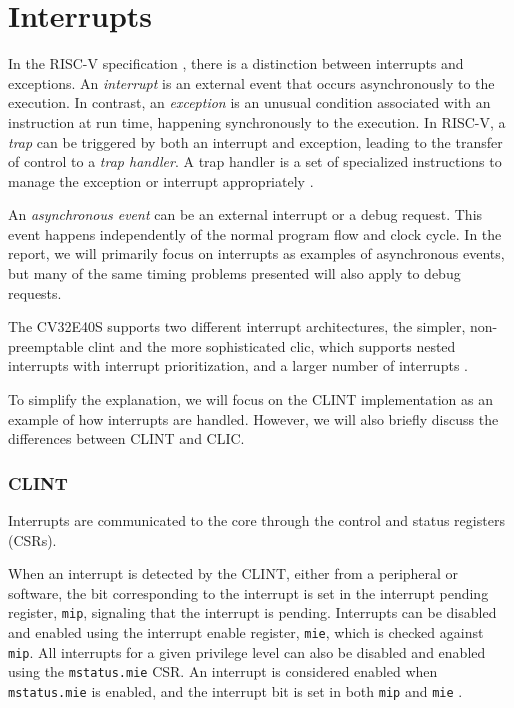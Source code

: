 \section{Interrupts}
\label{sec:bg_interrupts}

In the RISC-V specification \cite{watermanRISCVInstructionSet2021}, there is a distinction between interrupts and exceptions. An \textit{interrupt} is an external event that occurs asynchronously to the execution. In contrast, an \textit{exception} is an unusual condition associated with an instruction at run time, happening synchronously to the execution. In RISC-V, a \textit{trap} can be triggered by both an interrupt and exception, leading to the transfer of control to a \textit{trap handler}. A trap handler is a set of specialized instructions to manage the exception or interrupt appropriately \cite{watermanRISCVInstructionSet2021}. 

An \textit{asynchronous event} can be an external interrupt or a debug request. This event happens independently of the normal program flow and clock cycle. In the report, we will primarily focus on interrupts as examples of asynchronous events, but many of the same timing problems presented will also apply to debug requests.


The CV32E40S supports two different interrupt architectures, the simpler, non-preemptable \acrfull{clint} and the more sophisticated \acrfull{clic}, which supports nested interrupts with interrupt prioritization, and a larger number of interrupts \cite{openhwgroupExceptionsInterruptsCOREV2023}. 


To simplify the explanation, we will focus on the CLINT implementation as an example of how interrupts are handled. However, we will also briefly discuss the differences between CLINT and CLIC. 

\subsubsection{CLINT}
Interrupts are communicated to the core through the control and status registers (CSRs).

When an interrupt is detected by the CLINT, either from a peripheral or software, the bit corresponding to the interrupt is set in the interrupt pending register, \lstinline{mip}, signaling that the interrupt is pending.
Interrupts can be disabled and enabled using the interrupt enable register, \lstinline{mie}, which is checked against \lstinline{mip}. All interrupts for a given privilege level can also be disabled and enabled using the \lstinline{mstatus.mie} CSR. An interrupt is considered enabled when \lstinline{mstatus.mie} is enabled, and the interrupt bit is set in both \lstinline{mip} and \lstinline{mie} \cite{watermanRISCVInstructionSet2021}.

